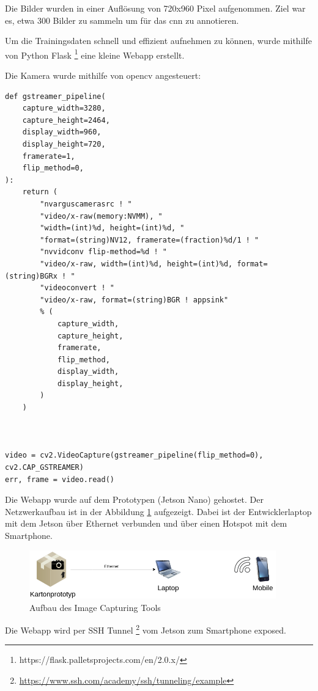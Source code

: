 Die Bilder wurden in einer Auflösung von 720x960 Pixel aufgenommen. Ziel war es, etwa 300 Bilder zu sammeln um für das \acrshort{cnn} zu annotieren.


Um die Trainingsdaten schnell und effizient aufnehmen zu können, wurde mithilfe von Python Flask 
\footnote{https://flask.palletsprojects.com/en/2.0.x/} eine kleine Webapp erstellt.

Die Kamera wurde mithilfe von opencv angesteuert:

\begin{verbatim}
def gstreamer_pipeline(
    capture_width=3280,
    capture_height=2464,
    display_width=960,
    display_height=720,
    framerate=1,
    flip_method=0,
):
    return (
        "nvarguscamerasrc ! "
        "video/x-raw(memory:NVMM), "
        "width=(int)%d, height=(int)%d, "
        "format=(string)NV12, framerate=(fraction)%d/1 ! "
        "nvvidconv flip-method=%d ! "
        "video/x-raw, width=(int)%d, height=(int)%d, format=(string)BGRx ! "
        "videoconvert ! "
        "video/x-raw, format=(string)BGR ! appsink"
        % (
            capture_width,
            capture_height,
            framerate,
            flip_method,
            display_width,
            display_height,
        )
    )



video = cv2.VideoCapture(gstreamer_pipeline(flip_method=0), cv2.CAP_GSTREAMER)
err, frame = video.read()
\end{verbatim}

Die Webapp wurde auf dem Prototypen (Jetson Nano) gehostet.
Der Netzwerkaufbau ist in der Abbildung \ref{fig:capturing-tool} aufgezeigt.
Dabei ist der Entwicklerlaptop mit dem Jetson über Ethernet verbunden und über einen
Hotspot mit dem Smartphone.

\begin{figure}[H]
  \includegraphics[width=0.95\textwidth]{img/CNN/net-diagram.png}
  \caption{Aufbau des Image Capturing Tools}
  \label{fig:capturing-tool}
\end{figure}

Die Webapp wird per SSH Tunnel \footnote{\url{https://www.ssh.com/academy/ssh/tunneling/example}}
vom Jetson zum Smartphone exposed.

